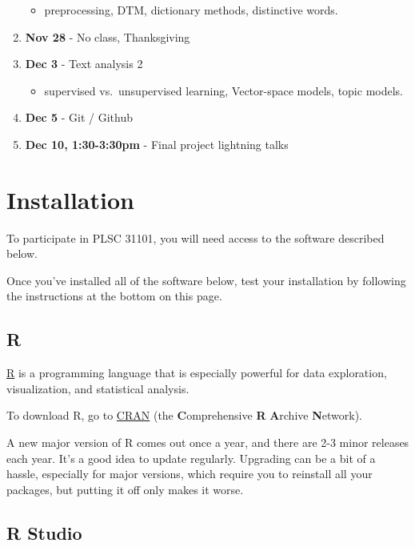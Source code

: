\documentclass[]{book}
\providecommand{\tightlist}{%
  \setlength{\itemsep}{0pt}\setlength{\parskip}{0pt}}
\begin{document}
\begin{enumerate}
  \begin{itemize}
  \tightlist
  \item
    preprocessing, DTM, dictionary methods, distinctive words.
  \end{itemize}
\item
  \textbf{Nov 28} - No class, Thanksgiving
\item
  \textbf{Dec 3} - Text analysis 2

  \begin{itemize}
  \tightlist
  \item
    supervised vs.~unsupervised learning, Vector-space models, topic models.
  \end{itemize}
\item
  \textbf{Dec 5} - Git / Github
\item
  \textbf{Dec 10, 1:30-3:30pm} - Final project lightning talks
\end{enumerate}

\hypertarget{installation}{%
\chapter{Installation}\label{installation}}

To participate in PLSC 31101, you will need access to the software described below.

Once you've installed all of the software below, test your installation by following the instructions at the bottom on this page.

\hypertarget{r}{%
\section{R}\label{r}}

\href{http://www.r-project.org/}{R} is a programming language that is especially powerful for data exploration, visualization, and statistical analysis.

To download R, go to \href{https://cran.r-project.org/}{CRAN} (the \textbf{C}omprehensive \textbf{R} \textbf{A}rchive \textbf{N}etwork).

A new major version of R comes out once a year, and there are 2-3 minor releases each year. It's a good idea to update regularly. Upgrading can be a bit of a hassle, especially for major versions, which require you to reinstall all your packages, but putting it off only makes it worse.

\hypertarget{r-studio}{%
\section{R Studio}\label{r-studio}}
\end{document}
